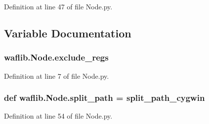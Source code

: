 Definition at line 47 of file Node.\+py.



\subsection{Variable Documentation}
\subsubsection[{\texorpdfstring{exclude\+\_\+regs}{exclude_regs}}]{ waflib.\+Node.\+exclude\+\_\+regs}\hypertarget{namespacewaflib_1_1_node_ad8641c31ccc808156a4dd30338d3373c}{}\label{namespacewaflib_1_1_node_ad8641c31ccc808156a4dd30338d3373c}


Definition at line 7 of file Node.\+py.

\subsubsection[{\texorpdfstring{split\+\_\+path}{split_path}}]{\setlength{\rightskip}{0pt plus 5cm}def waflib.\+Node.\+split\+\_\+path = {\bf split\+\_\+path\+\_\+cygwin}}\hypertarget{namespacewaflib_1_1_node_abaf115841ece756327532e2ea2b2a705}{}\label{namespacewaflib_1_1_node_abaf115841ece756327532e2ea2b2a705}


Definition at line 54 of file Node.\+py.

